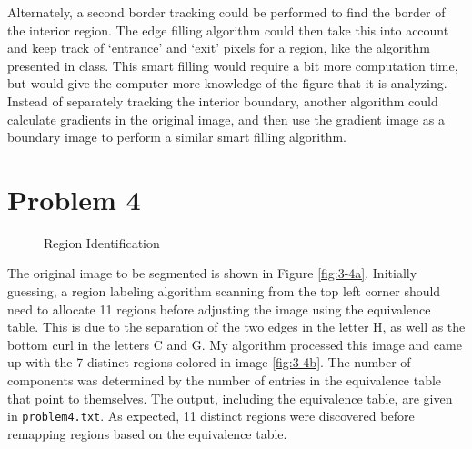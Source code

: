 \documentclass[aps,letterpaper,10pt]{article}
\newcommand{\ttt}{\texttt}
\begin{document}
Alternately, a second border tracking could be performed to find the border of the interior region.  The edge filling algorithm could then take this into account and keep track of `entrance' and `exit' pixels for a region, like the algorithm presented in class.  This smart filling would require a bit more computation time, but would give the computer more knowledge of the figure that it is analyzing.  Instead of separately tracking the interior boundary, another algorithm could calculate gradients in the original image, and then use the gradient image as a boundary image to perform a similar smart filling algorithm.
\newpage
\section{Problem 4}
\begin{figure}[!h]
\centering
{}\hspace{40px}
\caption{Region Identification}
\label{3-4}
\end{figure}
The original image to be segmented is shown in Figure \ref{fig:3-4a}.  Initially guessing, a region labeling algorithm scanning from the top left corner should need to allocate 11 regions before adjusting the image using the equivalence table.  This is due to the separation of the two edges in the letter \textsf{H}, as well as the bottom curl in the letters \textsf{C} and \textsf{G}.  My algorithm processed this image and came up with the 7 distinct regions colored in image \ref{fig:3-4b}.  The number of components was determined by the number of entries in the equivalence table that point to themselves.  The output, including the equivalence table, are given in \ttt{problem4.txt}.  As expected, 11 distinct regions were discovered before remapping regions based on the equivalence table.
\end{document}
